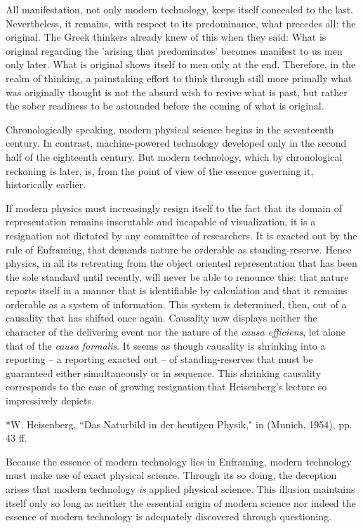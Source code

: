\documentclass[12pt]{article}
\begin{document}
All manifestation, not only modern technology, keeps itself concealed to the last. Nevertheless, it remains, with respect to its predominance, what precedes all: the original. The Greek thinkers already knew of this when they said: What is original regarding the 'arising that predominates' becomes manifest to us men only later. What is original shows itself to men only at the end. Therefore, in the realm of thinking, a painstaking effort to think through still more primally what was originally thought is not the absurd wish to revive what is past, but rather the sober readiness to be astounded before the coming of what is original.

Chronologically speaking, modern physical science begins in the seventeenth century. In contrast, machine-powered technology developed only in the second half of the eighteenth century. But modern technology, which by chronological reckoning is later, is, from the point of view of the essence governing it, historically earlier.

If modern physics must increasingly resign itself to the fact that its domain of representation remains inscrutable and incapable of visualization, it is a resignation not dictated by any committee of researchers. It is exacted out by the rule of Enframing, that demands nature be orderable as standing-reserve. Hence physics, in all its retreating from the object oriented representation that has been the sole standard until recently, will never be able to renounce this: that nature reports itself in a manner that is identifiable by calculation and that it remains orderable as a system of information. This system is determined, then, out of a causality that has shifted once again. Causality now displays neither the character of the delivering event nor the nature of the \textit{causa efficiens}, let alone that of the \textit{causa formalis}. It seems as though causality is shrinking into a reporting -- a reporting exacted out -- of standing-reserves that must be guaranteed either simultaneously or in sequence.  This shrinking causality corresponds to the case of growing resignation that Heisenberg's lecture so impressively depicts.

*W. Heisenberg, ``Das Naturbild in der heutigen Physik," in  (Munich, 1954), pp. 43 ff.

Because the essence of modern technology lies in Enframing, modern technology must make use of exact physical science. Through its so doing, the deception arises that modern technology \textit{is} applied physical science. This illusion maintains itself only so long as neither the essential origin of modern science nor indeed the essence of modern technology is adequately discovered through questioning.
\end{document}
